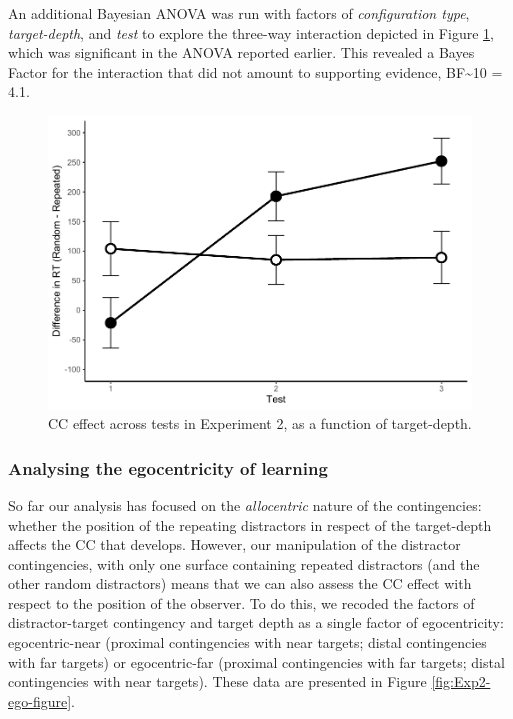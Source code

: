 \documentclass[
  english,
  man,floatsintext]{apa7}
\begin{document}
An additional Bayesian ANOVA was run with factors of \emph{configuration type}, \emph{target-depth}, and \emph{test} to explore the three-way interaction depicted in Figure \ref{fig:Exp2-CC-figure}, which was significant in the ANOVA reported earlier. This revealed a Bayes Factor for the interaction that did not amount to supporting evidence, BF\textasciitilde10 = 4.1.



\begin{figure}

{\centering \includegraphics[width=1\linewidth]{CCVR_manuscript_files/figure-latex/Exp2-CC-figure-1} 

}

\caption{CC effect across tests in Experiment 2, as a function of target-depth.}\label{fig:Exp2-CC-figure}
\end{figure}

\hypertarget{analysing-the-egocentricity-of-learning}{%
\subsubsection{Analysing the egocentricity of learning}\label{analysing-the-egocentricity-of-learning}}

So far our analysis has focused on the \emph{allocentric} nature of the contingencies: whether the position of the repeating distractors in respect of the target-depth affects the CC that develops. However, our manipulation of the distractor contingencies, with only one surface containing repeated distractors (and the other random distractors) means that we can also assess the CC effect with respect to the position of the observer. To do this, we recoded the factors of distractor-target contingency and target depth as a single factor of egocentricity: egocentric-near (proximal contingencies with near targets; distal contingencies with far targets) or egocentric-far (proximal contingencies with far targets; distal contingencies with near targets). These data are presented in Figure \ref{fig:Exp2-ego-figure}.
\end{document}
